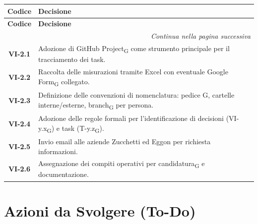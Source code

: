 \renewcommand{\arraystretch}{1.3}
\vspace{-0.3cm}
\noindent
\begin{longtable}{c p{12cm}}
    \toprule
    \textbf{Codice} & \textbf{Decisione} \\
    \midrule
    \endfirsthead

    \toprule
    \textbf{Codice} & \textbf{Decisione} \\
    \midrule
    \endhead

    \midrule
    \multicolumn{2}{r}{\textit{Continua nella pagina successiva}} \\
    \midrule
    \endfoot

    \bottomrule
    \endlastfoot

    \textbf{VI-2.1} & Adozione di GitHub Project\textsubscript{G} come strumento principale per il tracciamento dei task. \\
    \textbf{VI-2.2} & Raccolta delle misurazioni tramite Excel con eventuale Google Form\textsubscript{G} collegato. \\
    \textbf{VI-2.3} & Definizione delle convenzioni di nomenclatura: pedice G, cartelle interne/esterne, branch\textsubscript{G} per persona. \\
    \textbf{VI-2.4} & Adozione delle regole formali per l’identificazione di decisioni (VI-y.x\textsubscript{G}) e task (T-y.z\textsubscript{G}). \\
    \textbf{VI-2.5} & Invio email alle aziende Zucchetti ed Eggon per richiesta informazioni. \\
    \textbf{VI-2.6} & Assegnazione dei compiti operativi per candidatura\textsubscript{G} e documentazione. \\
\end{longtable}

\section{Azioni da Svolgere (To-Do)}

\renewcommand{\arraystretch}{1.3}

